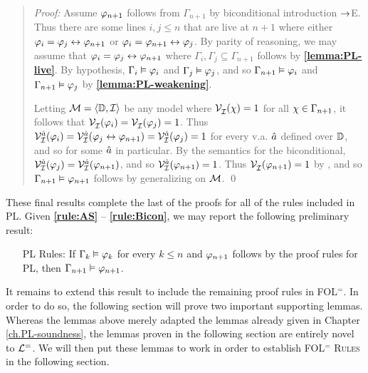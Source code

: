 
\begin{quote} 
  \textit{Proof:} Assume $\varphi_{n+1}$ follows from $\Gamma_{n+1}$ by biconditional introduction $\rightarrow$E.
Thus there are some lines $i,j\leq n$ that are live at $n+1$ where either $\varphi_i=\varphi_j\leftrightarrow\varphi_{n+1}$ or $\varphi_i=\varphi_{n+1}\leftrightarrow\varphi_j$.
  By parity of reasoning, we may assume that $\varphi_i=\varphi_j\leftrightarrow\varphi_{n+1}$ where $\Gamma_i,\Gamma_j\subseteq\Gamma_{n+1}$ follows by \textbf{\ref{lemma:PL-live}}.
  By hypothesis, $\Gamma_i\vDash \varphi_i$ and $\Gamma_j\vDash \varphi_j$, and so $\Gamma_{n+1} \vDash \varphi_i$ and $\Gamma_{n+1} \vDash \varphi_j$ by \textbf{\ref{lemma:PL-weakening}}.

  Letting $\mathcal{M}=\langle\mathbb{D},\mathcal{I}\rangle$ be any model where $\mathcal{V}_{\mathcal{I}}^{}(\chi) = 1$ for all $\chi \in \Gamma_{n+1}$, it follows that $\mathcal{V}_{\mathcal{I}}^{}(\varphi_i) = \mathcal{V}_{\mathcal{I}}^{}(\varphi_j) = 1$.
  Thus $\mathcal{V}_{\mathcal{I}}^{\hat{a}}(\varphi_i)=\mathcal{V}_{\mathcal{I}}^{\hat{a}}(\varphi_j\leftrightarrow\varphi_{n+1})=\mathcal{V}_{\mathcal{I}}^{\hat{a}}(\varphi_j)=1$ for every v.a. $\hat{a}$ defined over $\mathbb{D}$, and so for some $\hat{a}$ in particular. 
  By the semantics for the biconditional, $\mathcal{V}_{\mathcal{I}}^{\hat{a}}(\varphi_j)=\mathcal{V}_{\mathcal{I}}^{\hat{a}}(\varphi_{n+1})$, and so $\mathcal{V}_{\mathcal{I}}^{\hat{a}}(\varphi_{n+1})=1$.
  Thus $\mathcal{V}_{\mathcal{I}}^{}(\varphi_{n+1})=1$ by , and so $\Gamma_{n+1} \vDash \varphi_{n+1}$ follows by generalizing on $\mathcal{M}$.
  \qed
\end{quote}

These final results complete the last of the proofs for all of the rules included in PL.
Given \textbf{\ref{rule:AS}} -- \textbf{\ref{rule:Bicon}}, we may report the following preliminary result:

\begin{enumerate}[leftmargin=1.3in]
  \item[\sc PL Rules:] If $\Gamma_k \vDash \varphi_k$ for every $k\leq n$ and $\varphi_{n+1}$ follows by the proof rules for PL, then $\Gamma_{n+1} \vDash \varphi_{n+1}$.
\end{enumerate}

It remains to extend this result to include the remaining proof rules in FOL$^=$.
In order to do so, the following section will prove two important supporting lemmas.
Whereas the lemmas above merely adapted the lemmas already given in Chapter \ref{ch.PL-soundness}, the lemmas proven in the following section are entirely novel to $\mathcal{L}^{=}$.
We will then put these lemmas to work in order to establish \textsc{FOL$^=$ Rules} in the following section.



